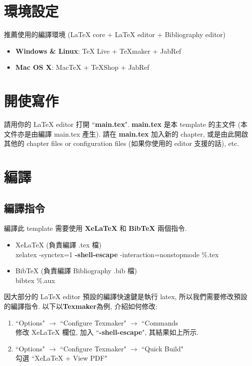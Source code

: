 \section{環境設定}

推薦使用的編譯環境 (LaTeX core + LaTeX editor + Bibliography editor)

\begin{itemize}
\item \textbf{Windows \& Linux}: TeX Live + TeXmaker + JabRef
\item \textbf{Mac OS X}: MacTeX + TeXShop + JabRef
\end{itemize}

\section{開使寫作}

請用你的 LaTeX editor 打開 ``\textbf{main.tex}".
\textbf{main.tex} 是本 template 的主文件 (本文件亦是由編譯 main.tex 產生).
請在 \textbf{main.tex} 加入新的 chapter, 或是由此開啟其他的 chapter files or configuration files (如果你使用的 editor 支援的話), etc.

\section{編譯}

\subsection{編譯指令}

編譯此 template 需要使用 \textbf{XeLaTeX} 和 \textbf{BibTeX} 兩個指令.

\begin{itemize}
\item XeLaTeX (負責編譯 .tex 檔)\\
xelatex -synctex=1 \textbf{-shell-escape} -interaction=nonstopmode \%.tex
\item BibTeX (負責編譯 Bibliography .bib 檔)\\
bibtex \%.aux
\end{itemize}

因大部分的 LaTeX editor 預設的編譯快速鍵是執行 latex, 所以我們需要修改預設的編譯指令.
以下以\textbf{Texmaker}為例, 介紹如何修改:
\begin{enumerate}
\item ``Options" $\rightarrow$ ``Configure Texmaker" $\rightarrow$ ``Commands\\
修改 XeLaTeX 欄位, 加入 ``\textbf{-shell-escape}", 其結果如上所示.
\item ``Options" $\rightarrow$ ``Configure Texmaker" $\rightarrow$ ``Quick Build"\\
勾選 ``XeLaTeX + View PDF"

\end{enumerate}

